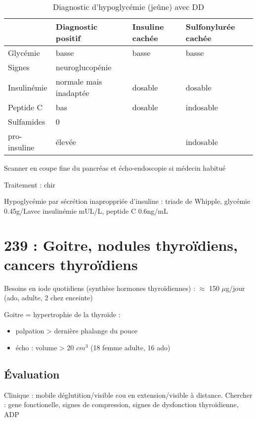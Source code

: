 \documentclass[11pt]{article}
\begin{document}
\begin{table}[htbp]
\caption{\label{tab:org2067c35}
Diagnostic d'hypoglycémie (jeûne) avec DD}
\centering
\begin{tabular}{llll}
\toprule
 & Diagnostic positif & Insuline cachée & Sulfonylurée cachée\\
\midrule
Glycémie & basse & basse & basse\\
Signes & neuroglucopénie &  & \\
Insulinémie & normale mais inadaptée & dosable & dosable\\
Peptide C & bas & dosable & indosable\\
Sulfamides & 0 &  & \\
pro-insuline & élevée &  & indosable\\
\bottomrule
\end{tabular}
\end{table}

Scanner en coupe fine du pancréas et écho-endoscopie si médecin habitué

Traitement : chir

\begin{tcolorbox}
Hypoglycémie par sécrétion inaproppriée d'insuline : triade de Whipple, glycémie \le 0.45g/L\footnotemark avec
insulinémie  mUL/L, peptide C \ge 0.6ng/mL
\end{tcolorbox}

\section{239 : Goitre, nodules thyroïdiens, cancers thyroïdiens}
\label{sec:orgd45578f}
Besoins en iode quotidiens (synthèse hormones thyroïdiennes) :  \(\approx\) 150 \(\mu\)g/jour (ado,
  adulte, \texttimes{} 2 chez enceinte)

Goitre = hypertrophie de la thyroïde :
\begin{itemize}
\item palpation > dernière phalange du pouce
\item écho : volume > 20 \(cm^3\) (18 femme adulte, 16 ado)
\end{itemize}

\subsection{Évaluation}
\label{sec:orgedec3a8}
Clinique : mobile déglutition/visible cou en extension/visible à
distance. Chercher : gene fonctionelle, signes de compression, signes de
dysfonction thyroïdienne, \acrshort{ADP}
\end{document}
